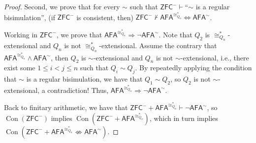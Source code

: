 \documentclass[10pt,a4paper]{amsart}
\newcommand{\afa}{\mathsf{AFA}}
\DeclareMathOperator{\con}{Con}
\newcommand{\zfc}{\mathsf{ZFC}}
\begin{document}
\begin{proof}
    Second, we prove that for every $\sim$ such that $\zfc^-\vdash$``$\sim$ is a regular bisimulation'', (if $\zfc^-$ is consistent, then) $\zfc^-\not\vdash\afa^{\cong_{Q_n}^*}\Leftrightarrow\afa^{\sim}$.
    
    Working in $\zfc^-$, we prove that $\afa^{\cong_{Q_n}^*}\Rightarrow\neg\afa^\sim$. Note that $Q_2$ is $\cong_{Q_n}^*$-extensional and $Q_n$ is not $\cong_{Q_n}^*$-extensional.
    Assume the contrary that $\afa^{\cong_{Q_n}^*}\land\afa^\sim$, then $Q_2$ is $\sim$-extensional and $Q_n$ is not $\sim$-extensional, i.e., there exist some $1\leq i<j\leq n$ such that $Q_i\sim Q_j$. By repeatedly applying the condition that $\sim$ is a regular bisimulation, we have that $Q_1\sim Q_2$, so $Q_2$ is not $\sim$-extensional, a contradiction! Thus, $\afa^{\cong_{Q_n}^*}\Rightarrow\neg\afa^\sim$.
    
    Back to finitary arithmetic, we have that $\zfc^-+\afa^{\cong_{Q_n}^*}\vdash\neg\afa^\sim$, so $\con(\zfc^-)$ implies $\con(\zfc^-+\afa^{\cong_{Q_n}^*})$, which in turn implies $\con(\zfc^-+\afa^{\cong_{Q_n}^*}\not\Leftrightarrow\afa^{\sim})$.
\end{proof}
\end{document}

